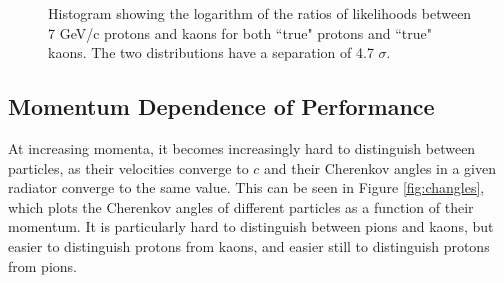 \begin{figure}[]
\centering
{}
\caption[Particle identification separation for 7 GeV/c kaons and protons]{Histogram showing the logarithm of the ratios of likelihoods between 7 GeV/c protons and kaons for both ``true" protons and ``true" kaons. The two distributions have a separation of  4.7 $\sigma$.}
\label{fig:kaonprotonsep} 
\end{figure}

\subsection{Momentum Dependence of Performance}

At increasing momenta, it becomes increasingly hard to distinguish between particles, as their velocities converge to $c$ and their Cherenkov angles in a given radiator converge to the same value. 
This can be seen in Figure \ref{fig:changles}, which plots the Cherenkov angles of different particles as a function of their momentum.
It is particularly hard to distinguish between pions and kaons, but easier to distinguish protons from kaons, and easier still to distinguish protons from pions.

